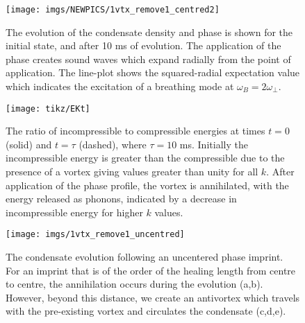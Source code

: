 \begin{figure}[tb]
    \texttt{[image: imgs/NEWPICS/1vtx\_remove1\_centred2]}
    \caption{The evolution of the condensate density and phase is shown for the initial state, and after 10 ms of evolution. The application of the phase creates sound waves which expand radially from the point of application. The line-plot shows the squared-radial expectation value which indicates the excitation of a breathing mode at $\omega_B = 2\omega_\perp$.}\label{fig:annihilation_1vtx}
\end{figure}

\begin{figure}[tb]
    \texttt{[image: tikz/EKt]}
    \caption{The ratio of incompressible to compressible energies at times $t=0$ (solid) and $t=\tau$ (dashed), where $\tau=10$ ms. Initially the incompressible energy is greater than the compressible due to the presence of a vortex giving values greater than unity for all $k$. After application of the phase profile, the vortex is annihilated, with the energy released as phonons, indicated by a decrease in incompressible energy for higher $k$ values.}\label{fig:kinspec}
\end{figure}

\begin{figure}[tb]
    \texttt{[image: imgs/1vtx\_remove1\_uncentred]}
    \caption{The condensate evolution following an uncentered phase imprint. For an imprint that is of the order of the healing length from centre to centre, the annihilation occurs during the evolution (a,b). However, beyond this distance, we create an antivortex which travels with the pre-existing vortex and circulates the condensate (c,d,e).}\label{fig:annihilation_1vtx_uncentred}
\end{figure}

